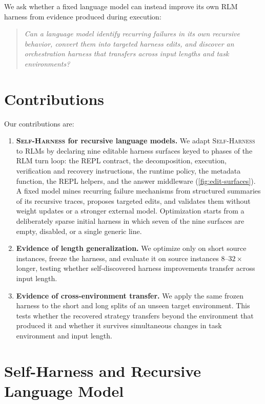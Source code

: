 \documentclass{article}
\newcommand{\rlm}{\textsc{RLM}\xspace}
\newcommand{\rlms}{\textsc{RLM}s\xspace}
\newcommand{\sh}{\textsc{Self-Harness}\xspace}
\begin{document}
We ask whether a fixed language model can instead improve its own RLM harness from
evidence produced during execution:
\begin{quote}
\emph{Can a language model identify recurring failures in its own recursive behavior,
convert them into targeted harness edits, and discover an orchestration harness that
transfers across input lengths and task environments?}
\end{quote}

\section{Contributions}

Our contributions are:

\begin{enumerate}
\item \textbf{\sh{} for recursive language models.}
We adapt \sh{} to \rlms by declaring nine editable harness surfaces keyed to phases of the \rlm{} turn loop: the REPL contract, the decomposition, execution, verification and recovery instructions, the runtime policy, the metadata function, the REPL helpers, and the answer middleware (\cref{fig:edit-surfaces}). A fixed model mines recurring failure mechanisms from structured summaries of its recursive traces, proposes targeted edits, and validates them without weight updates or a stronger external model. Optimization starts from a deliberately sparse initial harness in which seven of the nine surfaces are empty, disabled, or a single generic line.

\item \textbf{Evidence of length generalization.}
We optimize only on short source instances, freeze the harness, and evaluate it on source instances $8$--$32\times$ longer, testing whether self-discovered harness improvements transfer across input length.

\item \textbf{Evidence of cross-environment transfer.}
We apply the same frozen harness to the short and long splits of an unseen target environment. This tests whether the recovered strategy transfers beyond the environment that produced it and whether it survives simultaneous changes in task environment and input length.
\end{enumerate}


\section{Self-Harness and Recursive Language Model}
\end{document}
